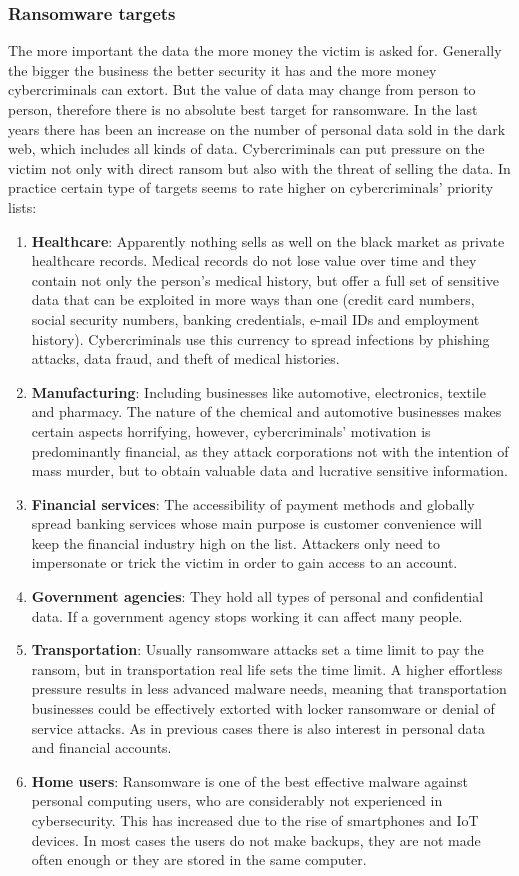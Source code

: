 \subsubsection{Ransomware targets}
The more important the data the more money the victim is asked for.
Generally the bigger the business the better security it has and the more money cybercriminals can extort.
\linej
But the value of data may change from person to person, therefore there is no absolute best target for ransomware.
In the last years there has been an increase on the number of personal data sold in the dark web, which includes all kinds of data.
Cybercriminals can put pressure on the victim not only with direct ransom but also with the threat of selling the data.
\linej
In practice certain type of targets seems to rate higher on cybercriminals' priority lists\cite{ransomware_digital_extortion}:
\begin{enumerate}
	\item \textbf{Healthcare}: Apparently nothing sells as well on the black market as private healthcare records.
		Medical records do not lose value over time and they contain not only the person's medical history, but offer a full set of sensitive data that can be exploited in more ways than one (credit card numbers, social security numbers, banking credentials, e-mail IDs and employment history).
Cybercriminals use this currency to spread infections by phishing attacks, data fraud, and theft of medical histories.
	\item \textbf{Manufacturing}: Including businesses like automotive, electronics, textile and pharmacy.
The nature of the chemical and automotive businesses makes certain aspects horrifying, however, cybercriminals' motivation is predominantly financial, as they attack corporations not with the intention of mass murder, but to obtain valuable data and lucrative sensitive information.
	\item \textbf{Financial services}: The accessibility of payment methods and globally spread banking services whose main purpose is customer convenience will keep the financial industry high on the list. Attackers only need to impersonate or trick the victim in order to gain access to an account.
	\item \textbf{Government agencies}: They hold all types of personal and confidential data. If a government agency stops working it can affect many people.
	\item \textbf{Transportation}: Usually ransomware attacks set a time limit to pay the ransom, but in transportation real life sets the time limit. A higher effortless pressure results in less advanced malware needs, meaning that transportation businesses could be effectively extorted with locker ransomware or denial of service attacks.
As in previous cases there is also interest in personal data and financial accounts.
	\item \textbf{Home users}: Ransomware is one of the best effective malware against personal computing users, who are considerably not experienced in cybersecurity.
This has increased due to the rise of smartphones and IoT devices.
In most cases the users do not make backups, they are not made often enough or they are stored in the same computer.
\end{enumerate}
